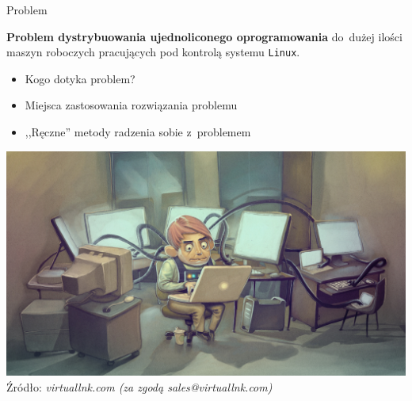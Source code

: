\documentclass[notes,polish,xcolor=dvipsnames,hyperref={unicode,hidelinks,pdftex,pdfauthor={Patryk Bęza},pdftitle={Protokół zarządzania stacjami komputerowymi pod kontrolą systemu Linux},pdfsubject={Praca dyplomowa magisterska na Wydziale Matematyki i Nauk Informacyjnych Politechniki Warszawskiej},pdfkeywords={Software Configuration Management, SCM, Infrastructure as Code, IaC, Linux, Communications Protocol},pdfproducer={XeLaTeX},pdfcreator={latexmk}}]{beamer}
\begin{document}
\begin{frame}{Problem}

\vspace*{-0.5cm}
\begin{exampleblock}{}
\textbf{Problem dystrybuowania ujednoliconego oprogramowania} do~dużej ilości maszyn roboczych pracujących pod kontrolą systemu \texttt{Linux}.
\end{exampleblock}

\vfill

\begin{itemize}
	\item Kogo dotyka problem?
	\item Miejsca zastosowania rozwiązania problemu
	\item ,,Ręczne'' metody radzenia sobie z~problemem
\end{itemize}

\vfill

\begin{center}
	\begin{minipage}{0.74\textheight}
		\includegraphics[width=\linewidth]{img/busy-admin}\\
		\raggedleft\color{gray}\tiny Źródło: \emph{virtuallnk.com (za zgodą sales@virtuallnk.com)}
	\end{minipage}
\end{center}

\end{frame}
\end{document}
